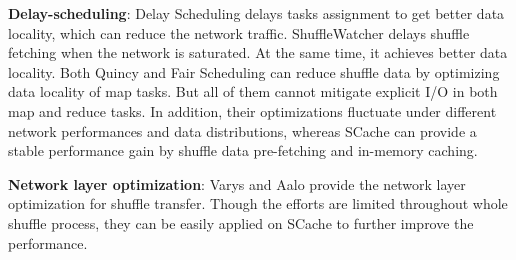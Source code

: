 \textbf{Delay-scheduling}: Delay Scheduling \cite{delay} delays tasks assignment to get better data locality, which can reduce the network traffic. 
ShuffleWatcher \cite{shufflewatcher} delays shuffle fetching when the network is saturated. 
At the same time, it achieves better data locality. 
Both Quincy \cite{quincy} and Fair Scheduling \cite{preemptive} can reduce shuffle data by optimizing data locality of map tasks. 
But all of them cannot mitigate explicit I/O in both map and reduce tasks. 
In addition, their optimizations fluctuate under different network performances and data distributions, whereas SCache can provide a stable performance gain by shuffle data pre-fetching and in-memory caching.

\textbf{Network layer optimization}: Varys \cite{varys} and Aalo \cite{aalo} provide the network layer optimization for shuffle transfer. 
Though the efforts are limited throughout whole shuffle process, they can be easily applied on SCache to further improve the performance.